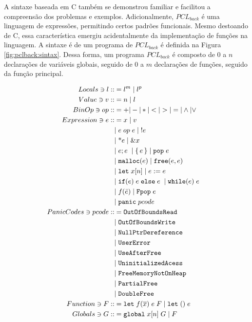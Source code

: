 A sintaxe baseada em C também se demonstrou familiar e facilitou a compreensão dos problemas e exemplos. Adicionalmente, $PCL_{back}$ é uma linguagem de expressões, permitindo certos padrões funcionais. Mesmo destoando de C, essa característica emergiu acidentalmente da implementação de funções na linguagem. A sintaxe é de um programa de $PCL_{back}$ é definida na Figura \ref{fig:pclback:sintax}. Dessa forma, um programa $PCL_{back}$ é composto de 0 a $n$ declarações de variáveis globais, seguido de 0 a $m$ declarações de funções, seguido da função principal.
\begin{figure*}[ht]
	\caption{Sintaxe de $PCL_{back}$}
	\label{fig:pclback:sintax}
	\begingroup
		\begin{align*}
			Locals \ni l ::&= l^m \;|\; l^p &&\\ 
			Value \ni v ::&= n \;|\; l && \\
			BinOp \ni op ::&= + | - | * | < | > | = | \land | \lor \\
			Expression \ni e ::&= x \;|\; v \\
			&|\; e\; op\; e \;|\; !e  \\
			&|\; \text{*}e \;|\; \&x \\
			&|\; e;e \; \;|\; \{\,e\,\} \;|\; \texttt{pop}\;e\; \\ 
			&|\; \texttt{malloc}(e) \;|\; \texttt{free}(e, e) \; \\ 
			&|\; \texttt{let}\; x[n] \;|\; e := e \; \\
			&|\; \texttt{if}(e) \; e \; \texttt{else} \; e \; \;|\; \texttt{while}(e) \; e \\
			&|\; f(\bar e) \;|\; \texttt{Fpop}\;e\\ 
			&|\; \texttt{panic}\;pcode \\ 
			PanicCodes \ni pcode ::&= \texttt{OutOfBoundsRead}\\
			&|\; \texttt{OutOfBoundsWrite}\\
			&|\; \texttt{NullPtrDereference}\\
			&|\; \texttt{UserError}\\
			&|\; \texttt{UseAfterFree}\\
			&|\; \texttt{UninitializedAcess}\\
			&|\; \texttt{FreeMemoryNotOnHeap}\\
			&|\; \texttt{PartialFree}\\
			&|\; \texttt{DoubleFree}\\
			Function \ni F ::&= \texttt{let} \; f(\overline{x})\; e \; F \; | \; \texttt{let}\;() \; e \\
			Globals \ni G ::&= \texttt{global}\; x[n] \;G \;|\; F
		\end{align*}
	\endgroup
\end{figure*}
\FloatBarrier

